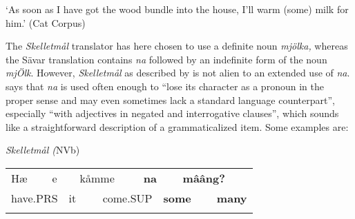 \begin{styleTranslation}
‘As soon as I have got the wood bundle into the house, I’ll warm (some) milk for him.’ (Cat Corpus)

\end{styleTranslation}

\begin{styleBodyTextFirst}
The \textit{Skelletmål} translator has here chosen to use a definite noun \textit{mjölka, }whereas the Sävar translation contains \textit{na }followed by an indefinite form of the noun \textit{mjÖlk}. However, \textit{Skelletmål} as described by \citet{Marklund1976} is not alien to an extended use of \textit{na}. \citet[43]{Marklund1976} says that \textit{na} is used often enough to “lose its character as a pronoun in the proper sense and may even sometimes lack a standard language counterpart”, especially “with adjectives in negated and interrogative clauses”, which sounds like a straightforward description of a grammaticalized item. Some examples are:

\end{styleBodyTextFirst}

\begin{listWWNumileveli}
\item {}

\begin{styleExample}
\textit{Skelletmål (}NVb)

\end{styleExample}

\end{listWWNumileveli}

\begin{tabular}{llllllllll}
\lsptoprule
Hæ & \multicolumn{2}{l}{e

} & \multicolumn{2}{l}{kåmme

} & \multicolumn{2}{l}{{\bfseries na}

} & \multicolumn{2}{l}{{\bfseries mââng?}

} & \\
\multicolumn{2}{l}{have.PRS

} & \multicolumn{2}{l}{it

} & \multicolumn{2}{l}{come.SUP

} & \multicolumn{2}{l}{{\bfseries some}

} & \multicolumn{2}{l}{{\bfseries many}

}\\
\lspbottomrule
\end{tabular}

